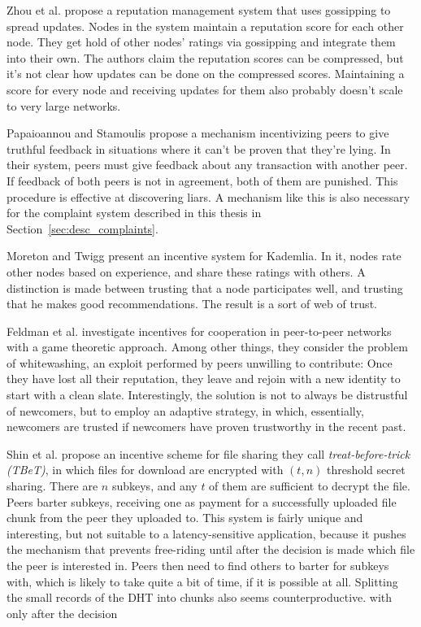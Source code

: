 Zhou et al.\cite{zhou2007gossip} propose a reputation management system that
uses gossipping to spread updates. Nodes in the system maintain a reputation
score for each other node. They get hold of other nodes' ratings via gossipping
and integrate them into their own. The authors claim the reputation scores can
be compressed, but it's not clear how updates can be done on the compressed
scores. Maintaining a score for every node and receiving updates for them also
probably doesn't scale to very large networks.

Papaioannou and Stamoulis\cite{papaioannou2005optimizing} propose a mechanism
incentivizing peers to give truthful feedback in situations where it can't be
proven that they're lying. In their system, peers must give feedback about any
transaction with another peer. If feedback of both peers is not in agreement,
both of them are punished. This procedure is effective at discovering liars.  A
mechanism like this is also necessary for the complaint system described in this
thesis in Section~\ref{sec:desc_complaints}.

Moreton and Twigg\cite{moreton2003enforcing} present an incentive system for
Kademlia. In it, nodes rate other nodes based on experience, and share these
ratings with others. A distinction is made between trusting that a node
participates well, and trusting that he makes good recommendations. The result
is a sort of web of trust.

Feldman et al.\cite{feldman2004robust} investigate incentives for cooperation
in peer-to-peer networks with a game theoretic approach. Among other things,
they consider the problem of whitewashing, an exploit performed by peers
unwilling to contribute: Once they have lost all their reputation, they leave
and rejoin with a new identity to start with a clean slate. Interestingly, the
solution is not to always be distrustful of newcomers, but to employ an adaptive
strategy, in which, essentially, newcomers are trusted if newcomers have proven
trustworthy in the recent past.

Shin et al. propose an incentive scheme for file sharing they call
\emph{treat-before-trick (TBeT)}\cite{shin2009treat}, in which files for
download are encrypted with $(t, n)$ threshold secret sharing. There are $n$
subkeys, and any $t$ of them are sufficient to decrypt the file. Peers barter
subkeys, receiving one as payment for a successfully uploaded file chunk from
the peer they uploaded to. This system is fairly unique and interesting, but not
suitable to a latency-sensitive application, because it pushes the mechanism
that prevents free-riding until after the decision is made which file the peer
is interested in. Peers then need to find others to barter for subkeys with,
which is likely to take quite a bit of time, if it is possible at all. Splitting
the small records of the \ac{DHT} into chunks also seems counterproductive.
with only after the decision

